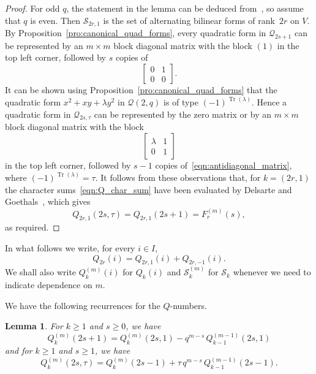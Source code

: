 \documentclass[10pt]{article}
\newtheorem{lemma}[theorem]{Lemma}
\theoremstyle{definition}
\newcommand{\Q}{\mathscr{Q}}
\renewcommand{\S}{\mathscr{S}}
\renewcommand{\t}{\tau}
\DeclareMathOperator{\Tr}{Tr}
\begin{document}
\begin{proof}
For odd $q$, the statement in the lemma can be deduced from~\cite[Lemma~6.3]{Sch2015}, so assume that $q$ is even. Then $\S_{2r,1}$ is the set of alternating bilinear forms of rank~$2r$ on $V$. By Proposition~\ref{pro:canonical_quad_forms}, every quadratic form in $\Q_{2s+1}$ can be represented by an $m\times m$ block diagonal matrix with the block $(1)$ in the top left corner, followed by $s$ copies of
\begin{equation}
\begin{bmatrix}
0 & 1\\
0 & 0
\end{bmatrix}.   \label{eqn:antidiagonal_matrix}
\end{equation}
It can be shown using Proposition~\ref{pro:canonical_quad_forms} that the quadratic form $x^2+xy+\lambda y^2$ in $\Q(2,q)$ is of type $(-1)^{\Tr(\lambda)}$. Hence a quadratic form in $\Q_{2s,\t}$ can be represented by the zero matrix or by an $m\times m$ block diagonal matrix with the block
\begin{equation}
\begin{bmatrix}
\lambda & 1\\
0       & 1
\end{bmatrix}\label{eqn:top_left_block}
\end{equation}
in the top left corner, followed by $s-1$ copies of~\eqref{eqn:antidiagonal_matrix}, where $(-1)^{\Tr(\lambda)}=\t$. It follows from these observations that, for $k=(2r,1)$ the character sums~\eqref{eqn:Q_char_sum} have been evaluated by Delsarte and Goethals~\cite[Appendix]{DelGoe1975}, which gives 
\[
Q_{2r,1}(2s,\t)=Q_{2r,1}(2s+1)=F^{(m)}_r(s),
\]
as required.
\end{proof}
\par
In what follows we write, for every $i\in I$,
\[
Q_{2r}(i)=Q_{2r,1}(i)+Q_{2r,-1}(i).
\]
We shall also write $Q^{(m)}_k(i)$ for $Q_k(i)$ and $\S_k^{(m)}$ for $\S_k$ whenever we need to indicate dependence on $m$.
\par
We have the following recurrences for the $Q$-numbers.
\begin{lemma}
\label{lem:recurrence_Q}
For $k\ge 1$ and $s\ge 0$, we have
\begin{equation}
Q^{(m)}_k(2s+1)=Q^{(m)}_k(2s,1)-q^{m-s}\,Q^{(m-1)}_{k-1}(2s,1)   \label{eqn:rec_Q_1}
\end{equation}
and for $k\ge 1$ and $s\ge 1$, we have
\begin{equation}
Q^{(m)}_k(2s,\t)=Q^{(m)}_k(2s-1)+\tau\,q^{m-s}\,Q^{(m-1)}_{k-1}(2s-1)   \label{eqn:rec_Q_2}.
\end{equation}
\end{lemma}
\end{document}
